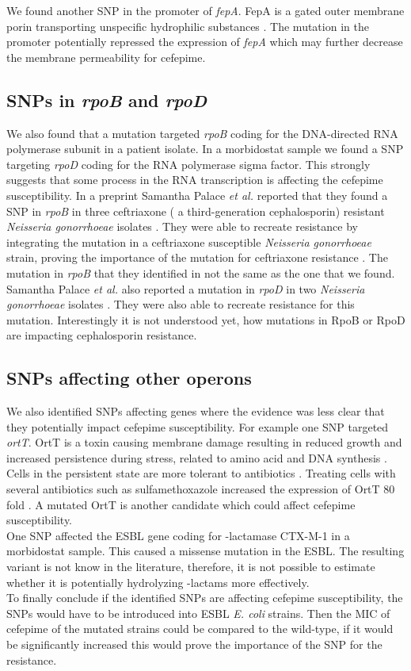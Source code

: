 We found another SNP in the promoter of \textit{fepA}. FepA is a gated outer membrane porin transporting unspecific hydrophilic substances \cite{liu_permeability_1993}. The mutation in the promoter potentially repressed the expression of \textit{fepA} which may further decrease the membrane permeability for cefepime. 
\subsection{SNPs in \textit{rpoB} and \textit{rpoD}}
We also found that a mutation targeted \textit{rpoB} coding for the DNA-directed RNA polymerase subunit \textbeta \space in a patient isolate. In a morbidostat sample we found a SNP targeting \textit{rpoD} coding for the RNA polymerase sigma factor. This strongly suggests that some process in the RNA transcription is affecting the cefepime susceptibility. In a preprint Samantha Palace \textit{et al.} reported that they found a SNP in \textit{rpoB} in three ceftriaxone ( a third-generation cephalosporin) resistant \textit{Neisseria gonorrhoeae} isolates \cite{palace_rna_2019}. They were able to recreate resistance by integrating the mutation in a ceftriaxone susceptible \textit{Neisseria gonorrhoeae} strain, proving the importance of the mutation for ceftriaxone resistance \cite{palace_rna_2019}. The mutation in \textit{rpoB} that they identified in not the same as the one that we found. Samantha Palace \textit{et al.} also reported a mutation in \textit{rpoD} in two \textit{Neisseria gonorrhoeae} isolates \cite{palace_rna_2019}. They were also able to recreate resistance for this mutation. Interestingly it is not understood yet, how mutations in RpoB or RpoD are impacting cephalosporin resistance. 
\subsection{SNPs affecting other operons}
We also identified SNPs affecting genes where the evidence was less clear that they potentially impact cefepime susceptibility. For example one SNP targeted \textit{ortT}. OrtT is a toxin causing membrane damage resulting in reduced growth and increased persistence during stress, related to amino acid and DNA synthesis \cite{islam_orphan_2015}. Cells in the persistent state are more tolerant to antibiotics \cite{islam_orphan_2015}. Treating cells with several antibiotics such as sulfamethoxazole increased the expression of OrtT 80 fold \cite{islam_orphan_2015}. A mutated OrtT is another candidate which could affect cefepime susceptibility. \\
One SNP affected the ESBL gene coding for \textbeta-lactamase CTX-M-1 in a morbidostat sample. This caused a missense mutation in the ESBL. The resulting variant is not know in the literature, therefore, it is not possible to estimate whether it is potentially hydrolyzing \textbeta-lactams more effectively. \\

To finally conclude if the identified SNPs are affecting cefepime susceptibility, the SNPs would have to be introduced into ESBL \textit{E. coli} strains. Then the MIC of cefepime of the mutated strains could be compared to the wild-type, if it would be significantly increased this would prove the importance of the SNP for the resistance. 